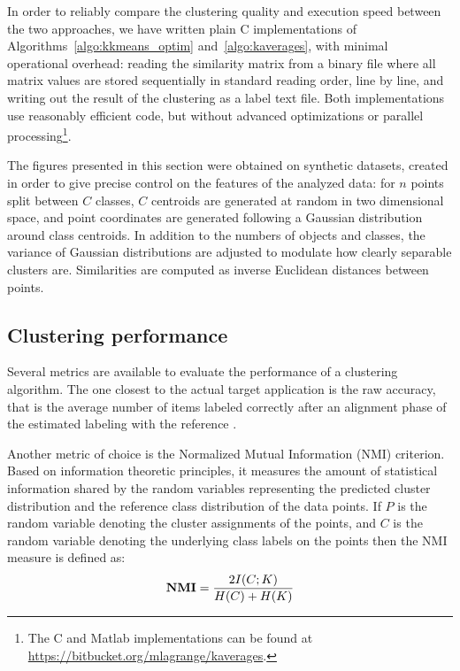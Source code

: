 \documentclass[natbib,smallextended]{svjour3}
\begin{document}
In order to reliably compare the clustering quality and execution speed between the two approaches, we have written plain C implementations of Algorithms~\ref{algo:kkmeans_optim} and~\ref{algo:kaverages}, with minimal operational overhead: reading the similarity matrix from a binary file where all matrix values are stored sequentially in standard reading order, line by line, and writing out the result of the clustering as a label text file. Both implementations use reasonably efficient code, but without advanced optimizations or parallel processing\footnote{The C and Matlab implementations can be found at\\ \url{https://bitbucket.org/mlagrange/kaverages}.}.	%

The figures presented in this section were obtained on synthetic datasets, created in order to give precise control on the features of the analyzed data: for $n$ points split between $C$ classes, $C$ centroids are generated at random in two dimensional space, and point coordinates are generated following a Gaussian distribution around class centroids. In addition to the numbers of objects and classes, the variance of Gaussian distributions are adjusted to modulate how clearly separable clusters are. Similarities are computed as inverse Euclidean distances between points. %

\subsection{Clustering performance}

Several metrics are available to evaluate the performance of a clustering algorithm. The one closest to the actual target application is the raw accuracy, that is the average number of items labeled correctly after an alignment phase of the estimated labeling with the reference \citep{Kuhn1955Hungarian}.

Another metric of choice is the Normalized Mutual Information (NMI) criterion. Based on information theoretic principles, it measures the amount of statistical information shared by the random variables representing the predicted cluster distribution and the reference class distribution of the data points. If $P$ is the random variable denoting the cluster assignments of the points, and $C$ is the random variable denoting the underlying class labels on the points then the NMI measure is defined as:
\[
\textbf{NMI} = \frac{ 2\- I(C;K) }{H(C)+H(K)}
\]
\end{document}
